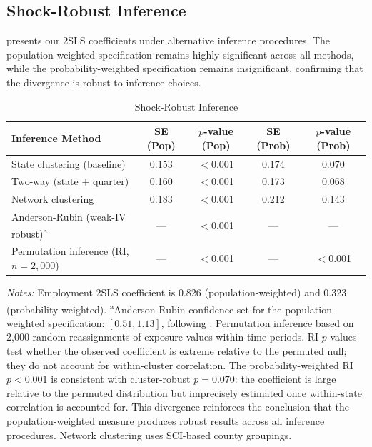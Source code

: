 \documentclass[12pt]{article}
\begin{document}
\subsection{Shock-Robust Inference}

 presents our 2SLS coefficients under alternative inference procedures. The population-weighted specification remains highly significant across all methods, while the probability-weighted specification remains insignificant, confirming that the divergence is robust to inference choices.

\begin{table}[t]
\centering
\caption{Shock-Robust Inference}
\label{tab:inference}
\begin{threeparttable}
\small
\begin{tabular}{lcccc}
\toprule
Inference Method & SE (Pop) & $p$-value (Pop) & SE (Prob) & $p$-value (Prob) \\
\midrule
State clustering (baseline) & 0.153 & $<$0.001 & 0.174 & 0.070 \\
Two-way (state $+$ quarter) & 0.160 & $<$0.001 & 0.173 & 0.068 \\
Network clustering & 0.183 & $<$0.001 & 0.212 & 0.143 \\
Anderson-Rubin (weak-IV robust)\textsuperscript{a} & --- & $<$0.001 & --- & --- \\
Permutation inference (RI, $n=2{,}000$) & --- & $<$0.001 & --- & $<$0.001 \\
\bottomrule
\end{tabular}
\begin{tablenotes}[flushleft]
\footnotesize
\item \textit{Notes:} Employment 2SLS coefficient is 0.826 (population-weighted) and 0.323 (probability-weighted).
\textsuperscript{a}Anderson-Rubin confidence set for the population-weighted specification: $[0.51, 1.13]$,
following \citet{andrews2019weak}. Permutation inference based on 2,000 random reassignments of
exposure values within time periods. RI $p$-values test whether the observed coefficient is extreme
relative to the permuted null; they do not account for within-cluster correlation. The
probability-weighted RI $p < 0.001$ is consistent with cluster-robust $p = 0.070$: the coefficient
is large relative to the permuted distribution but imprecisely estimated once within-state
correlation is accounted for. This divergence reinforces the conclusion that the
population-weighted measure produces robust results across all inference procedures.
Network clustering uses SCI-based county groupings.
\end{tablenotes}
\end{threeparttable}
\end{table}
\end{document}
